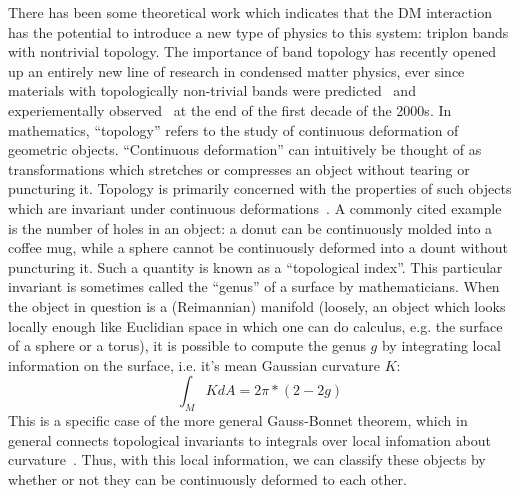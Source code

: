 \documentclass{thesis-umich}
\begin{document}
There has been some theoretical work which indicates that the DM interaction has the potential to introduce a new type of physics to this system: triplon bands with nontrivial topology. The importance of band topology has recently opened up an entirely new line of research in condensed matter physics, ever since materials with topologically non-trivial bands were predicted~\cite{Fu2007} and experiementally observed~\cite{Hsieh2008} at the end of the first decade of the 2000s. In mathematics, ``topology'' refers to the study of continuous deformation of geometric objects. ``Continuous deformation'' can intuitively be thought of as transformations which stretches or compresses an object without tearing or puncturing it. Topology is primarily concerned with the properties of such objects which are invariant under continuous deformations~\cite{Munkres}. A commonly cited example is the number of holes in an object: a donut can be continuously molded into a coffee mug, while a sphere cannot be continuously deformed into a dount without puncturing it. Such a quantity is known as a ``topological index''. This particular invariant is sometimes called the ``genus'' of a surface by mathematicians. When the object in question is a (Reimannian) manifold (loosely, an object which looks locally enough like Euclidian space in which one can do calculus, e.g. the surface of a sphere or a torus), it is possible to compute the genus $g$ by integrating local information on the surface, i.e. it's mean Gaussian curvature $K$:
\[ \int_M K dA = 2\pi * (2 - 2 g) \]
This is a specific case of the more general Gauss-Bonnet theorem, which in general connects topological invariants to integrals over local infomation about curvature~\cite{Lee}. Thus, with this local information, we can classify these objects by whether or not they can be continuously deformed to each other.
\end{document}
